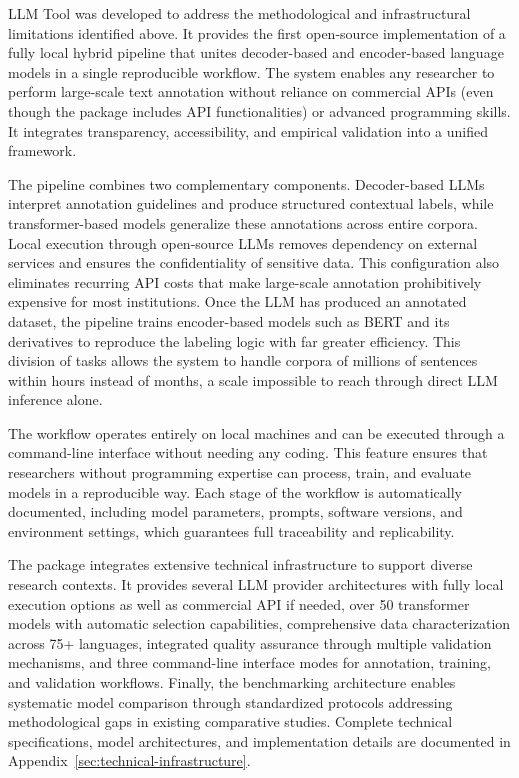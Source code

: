 \documentclass[12pt]{article}
\begin{document}
LLM Tool was developed to address the methodological and infrastructural limitations identified above. It provides the first open-source implementation of a fully local hybrid pipeline that unites decoder-based and encoder-based language models in a single reproducible workflow. The system enables any researcher to perform large-scale text annotation without reliance on commercial APIs (even though the package includes API functionalities) or advanced programming skills. It integrates transparency, accessibility, and empirical validation into a unified framework.

The pipeline combines two complementary components. Decoder-based LLMs interpret annotation guidelines and produce structured contextual labels, while transformer-based models generalize these annotations across entire corpora. Local execution through open-source LLMs removes dependency on external services and ensures the confidentiality of sensitive data. This configuration also eliminates recurring API costs that make large-scale annotation prohibitively expensive for most institutions. Once the LLM has produced an annotated dataset, the pipeline trains encoder-based models such as BERT and its derivatives to reproduce the labeling logic with far greater efficiency. This division of tasks allows the system to handle corpora of millions of sentences within hours instead of months, a scale impossible to reach through direct LLM inference alone.

The workflow operates entirely on local machines and can be executed through a command-line interface without needing any coding. This feature ensures that researchers without programming expertise can process, train, and evaluate models in a reproducible way. Each stage of the workflow is automatically documented, including model parameters, prompts, software versions, and environment settings, which guarantees full traceability and replicability.

The package integrates extensive technical infrastructure to support diverse research contexts. It provides several LLM provider architectures with fully local execution options as well as commercial API if needed, over 50 transformer models with automatic selection capabilities, comprehensive data characterization across 75+ languages, integrated quality assurance through multiple validation mechanisms, and three command-line interface modes for annotation, training, and validation workflows. Finally, the benchmarking architecture enables systematic model comparison through standardized protocols addressing methodological gaps in existing comparative studies. Complete technical specifications, model architectures, and implementation details are documented in Appendix~\ref{sec:technical-infrastructure}.
\end{document}
